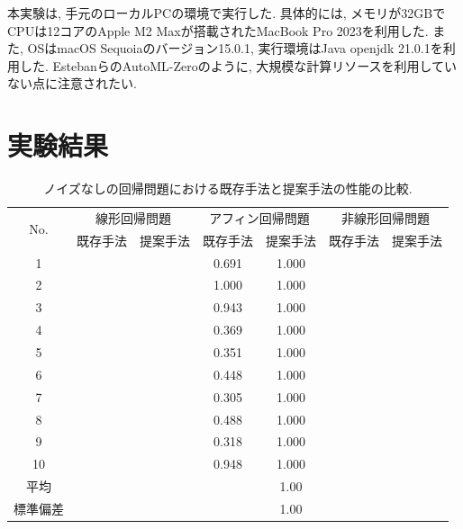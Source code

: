 \documentclass[11pt,oneside,openany,report]{jsbook}
\begin{document}
本実験は, 手元のローカルPCの環境で実行した. 具体的には, メモリが32GBでCPUは12コアのApple M2 Maxが搭載されたMacBook Pro 2023を利用した. また, OSはmacOS Sequoiaのバージョン15.0.1, 実行環境はJava openjdk 21.0.1を利用した. EstebanらのAutoML-Zeroのように, 大規模な計算リソースを利用していない点に注意されたい.

\section{実験結果}\label{sec:proposed:exp:result}

\begin{table}[tbp]
  \caption{ノイズなしの回帰問題における既存手法と提案手法の性能の比較.}
  \label{table:exp:result:regression}
  \centering
  \begin{tabular}{|c|c|c|c|c|c|c|}
    \hline
    \multirow{2}{*}{No. } & \multicolumn{2}{c|}{線形回帰問題} & \multicolumn{2}{c|}{アフィン回帰問題} & \multicolumn{2}{c|}{非線形回帰問題} \\
    \cline{2-7}
    & 既存手法 & 提案手法 & 既存手法 & 提案手法 & 既存手法 & 提案手法 \\
    \hline \hline
    1       &   &  & 0.691 & 1.000 &  &  \\
    2       &   &  & 1.000 & 1.000 &  &  \\
    3       &   &  & 0.943 & 1.000 &  &  \\
    4       &   &  & 0.369 & 1.000 &  &  \\
    5       &   &  & 0.351 & 1.000 &  &  \\
    6       &   &  & 0.448 & 1.000 &  &  \\
    7       &   &  & 0.305 & 1.000 &  &  \\
    8       &   &  & 0.488 & 1.000 &  &  \\
    9       &   &  & 0.318 & 1.000 &  &  \\
    10      &   &  & 0.948 & 1.000 &  &  \\
    \hline
    平均 & & & & 1.00 & & \\
    標準偏差 & & & & 1.00 & & \\
    \hline
  \end{tabular}
\end{table}
\end{document}
